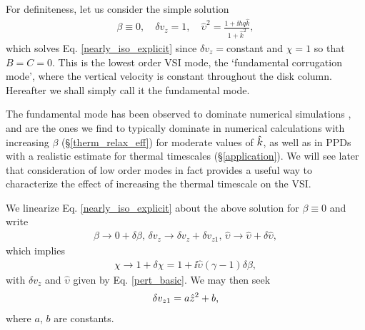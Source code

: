 For definiteness, let us consider the simple solution 
\begin{align}
  \beta\equiv 0, \quad \delta v_z = 1,\quad \hat{\upsilon}^2 = \frac{1 +
  \ii h q \hat{k}}{1+\hat{k}^2}, \label{pert_basic} 
\end{align}
which solves Eq. \ref{nearly_iso_explicit} since $\delta
v_z=$constant and $\chi=1$ so that $B=C=0$. 
This is the lowest order VSI mode, the `fundamental corrugation mode',
where the vertical velocity is constant throughout the disk
column. Hereafter we shall simply call it the fundamental
mode. 

The fundamental mode has been observed to dominate numerical simulations
\citep[]{stoll14}, and are the ones we find to typically 
dominate in numerical calculations with increasing $\beta$
(\S\ref{therm_relax_eff}) for moderate    
values of $\hat{k}$, as well as in PPDs 
with a realistic estimate for thermal timescales
(\S\ref{application}). We will see later that consideration of low
order modes in fact provides a useful way to characterize the effect
of increasing the thermal timescale on the VSI. 

We linearize Eq. \ref{nearly_iso_explicit} about the above
solution for $\beta\equiv0$ and write 
\begin{align}\label{nearly_iso_pert}
  \beta \to 0 + \delta\beta,\, \delta v_z\to \delta v_z+\delta
  v_{z1},\,\hat{\upsilon} \to \hat{\upsilon} + \delta\hat{\upsilon}, 
\end{align}
which implies 
\begin{align}
  \chi \to 1 + \delta\chi = 1 + \ii \hat{\upsilon}\left(\gamma-1\right)\delta\beta,
\end{align}
with $\delta v_z$ and $\hat{\upsilon}$ given by Eq. \ref{pert_basic}. We
may then seek  
\begin{align}
  \delta v_{z1} = a \hat{z}^2 + b,
\end{align}
where $a$, $b$ are constants. 

